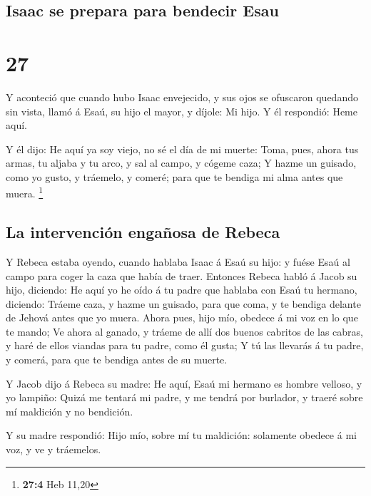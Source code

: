 \hypertarget{isaac-se-prepara-para-bendecir-esau}{%
\subsection{Isaac se prepara para bendecir
Esau}\label{isaac-se-prepara-para-bendecir-esau}}

\hypertarget{section-26}{%
\section{27}\label{section-26}}

 Y aconteció que cuando hubo Isaac envejecido, y sus ojos
se ofuscaron quedando sin vista, llamó á Esaú, su hijo el mayor, y
díjole: Mi hijo. Y él respondió: Heme aquí.

 Y él dijo: He aquí ya soy viejo, no sé el día de mi
muerte:  Toma, pues, ahora tus armas, tu aljaba y tu arco,
y sal al campo, y cógeme caza;  Y hazme un guisado, como
yo gusto, y tráemelo, y comeré; para que te bendiga mi alma antes que
muera. \footnote{\textbf{27:4} Heb 11,20}

\hypertarget{la-intervenciuxf3n-engauxf1osa-de-rebeca}{%
\subsection{La intervención engañosa de
Rebeca}\label{la-intervenciuxf3n-engauxf1osa-de-rebeca}}

 Y Rebeca estaba oyendo, cuando hablaba Isaac á Esaú su
hijo: y fuése Esaú al campo para coger la caza que había de traer.
 Entonces Rebeca habló á Jacob su hijo, diciendo: He aquí
yo he oído á tu padre que hablaba con Esaú tu hermano, diciendo:
 Tráeme caza, y hazme un guisado, para que coma, y te
bendiga delante de Jehová antes que yo muera.  Ahora pues,
hijo mío, obedece á mi voz en lo que te mando;  Ve ahora
al ganado, y tráeme de allí dos buenos cabritos de las cabras, y haré de
ellos viandas para tu padre, como él gusta;  Y tú las
llevarás á tu padre, y comerá, para que te bendiga antes de su muerte.

 Y Jacob dijo á Rebeca su madre: He aquí, Esaú mi hermano
es hombre velloso, y yo lampiño:  Quizá me tentará mi
padre, y me tendrá por burlador, y traeré sobre mí maldición y no
bendición.

 Y su madre respondió: Hijo mío, sobre mí tu maldición:
solamente obedece á mi voz, y ve y tráemelos.

